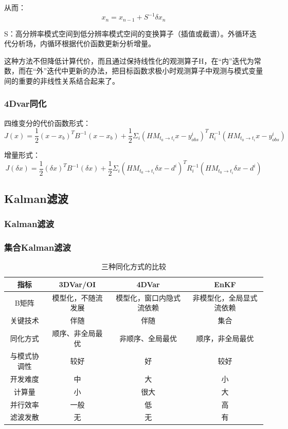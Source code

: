 \documentclass{article}
\begin{document}
从而：
$$x_n = x_{n-1} + S^{-1}\delta x_n$$

S：高分辨率模式空间到低分辨率模式空间的变换算子（插值或截谱）。外循环迭代分析场，内循环根据代价函数更新分析增量。

这种方法不但降低计算代价，而且通过保持线性化的观测算子H，在“内”迭代为常数，而在“外”迭代中更新的办法，把目标函数求极小时观测算子中观测与模式变量间的重要的非线性关系结合起来了。

\subsubsection{4Dvar同化}
四维变分的代价函数形式：
$$J(x) = \frac{1}{2}(x-x_b)^{T}B^{-1}(x-x_b) + \frac{1}{2}\Sigma_i(HM_{t_0\longrightarrow t_i}x-y^i_{obs})^{T}R_i^{-1}(HM_{t_0\longrightarrow t_i}x-y^i_{obs})$$

增量形式：
$$J(\delta x) = \frac{1}{2}(\delta x)^{T}B^{-1}(\delta x) + \frac{1}{2}\Sigma_i(HM_{t_0\longrightarrow t_i}\delta x-d^i)^{T}R_i^{-1}(HM_{t_0\longrightarrow t_i}\delta x-d^i)$$

\subsection{Kalman滤波}
\subsubsection{Kalman滤波}
\subsubsection{集合Kalman滤波}
\begin{table}[h!]
  \begin{center}
    \caption{三种同化方式的比较}
    \begin{tabular}{c|c|c|c} 
      \textbf{指标} & \textbf{3DVar/OI} & \textbf{4DVar} & \textbf{EnKF}\\
      \hline
      B矩阵 & 模型化，不随流发展 & 模型化，窗口内隐式流依赖 & 非模型化，全局显式流依赖 \\
      关键技术 & 伴随 & 伴随 & 集合\\
      同化方式 & 顺序、非全局最优 & 非顺序、全局最优 & 顺序，非全局最优\\
      与模式协调性 & 较好 & 好 &  较好\\
      开发难度&中&大&小\\
      计算量&小&很大&大\\
      并行效率&一般&低&高\\
      滤波发散&无&无&有
    \end{tabular}
  \end{center}
  \end{table}
\end{document}
